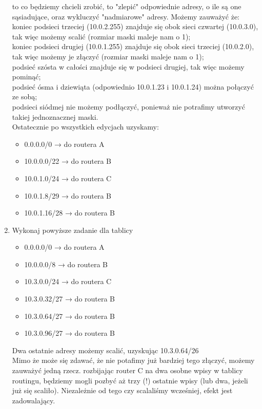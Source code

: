 \documentclass{article}[A4]
\begin{document}
\begin{enumerate}
to co będziemy chcieli zrobić, to "zlepić" odpowiednie adresy, o ile są one sąsiadujące, oraz wykluczyć "nadmiarowe" adresy.
Możemy zauważyć że:\\
 \null \quad koniec podsieci trzeciej (10.0.2.255) znajduje się obok sieci czwartej (10.0.3.0), tak więc możemy scalić (rozmiar maski maleje nam o 1);\\
  \null \quad koniec podsieci drugiej (10.0.1.255) znajduje się obok sieci trzeciej (10.0.2.0), tak więc możemy je złączyć (rozmiar maski maleje nam o 1);\\
 \null \quad podsieć szósta w całości znajduje się w podsieci drugiej, tak więc możemy pominąć;\\
 \null \quad podsieć ósma i dziewiąta (odpowiednio 10.0.1.23 i 10.0.1.24) można połączyć ze sobą;\\
 \null \quad podsieci siódmej nie możemy podłączyć, ponieważ nie potrafimy utworzyć takiej jednoznacznej maski.\\
  Ostatecznie po wszystkich edycjach uzyskamy:
 \begin{itemize}[label=$\blacktriangleright$]
	\item 0.0.0.0/0 → do routera A
	\item 10.0.0.0/22 → do routera B
	\item 10.0.1.0/24 → do routera C
	\item 10.0.1.8/29 → do routera B
	\item 10.0.1.16/28 → do routera B
\end{itemize}
 \item{Wykonaj powyższe zadanie dla tablicy
 \begin{itemize}[label=$\blacktriangleright$]
	\item 0.0.0.0/0 → do routera A
	\item 10.0.0.0/8 → do routera B
	\item 10.3.0.0/24 → do routera C
	\item 10.3.0.32/27 → do routera B
	\item 10.3.0.64/27 → do routera B
	\item 10.3.0.96/27 → do routera B
\end{itemize}}
\null \quad Dwa ostatnie adresy możemy scalić, uzyskując 10.3.0.64/26\\
\null \quad Mimo że może się zdawać, że nie potafimy już bardziej tego złączyć, możemy zauważyć jedną rzecz. rozbijając router C na dwa osobne wpisy w tablicy routingu, będziemy mogli pozbyć aż trzy (!) ostatnie wpisy (lub dwa, jeżeli już się scaliło). Niezależnie od tego czy scalaliśmy wcześniej, efekt jest zadowalający.

\end{enumerate}
\end{document}
